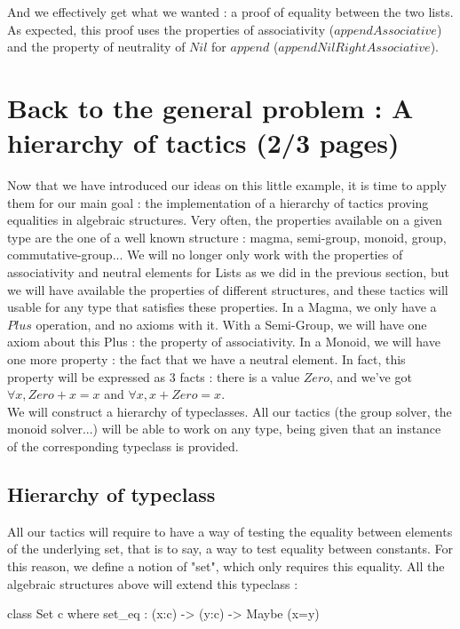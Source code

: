 \documentclass{sigplanconf}
\begin{document}
And we effectively get what we wanted : a proof of equality between the two lists. As expected, this proof uses the properties of associativity ($appendAssociative$) and the property of neutrality of $Nil$ for $append$ ($appendNilRightAssociative$).

\section {Back to the general problem : A hierarchy of tactics (2/3 pages)}

Now that we have introduced our ideas on this little example, it is time to apply them for our main goal : the implementation of a hierarchy of tactics proving equalities in algebraic structures. Very often, the properties available on a given type are the one of a well known structure : magma, semi-group, monoid, group, commutative-group...  We will no longer only work with the properties of associativity and neutral elements for Lists as we did in the previous section, but we will have available the properties of different structures, and these tactics will usable for any type that satisfies these properties.
In a Magma, we only have a $Plus$ operation, and no axioms with it. With a Semi-Group, we will have one axiom about this Plus : the property of associativity. In a Monoid, we will have one more property : the fact that we have a neutral element. In fact, this property will be expressed as 3 facts : there is a value $Zero$, and we've got $\forall x, Zero + x = x$ and $\forall x, x + Zero = x$. \\

We will construct a hierarchy of typeclasses. All our tactics (the group solver, the monoid solver...) will be able to work on any type, being given that an instance of the corresponding typeclass is provided.

\subsection {Hierarchy of typeclass}

All our tactics will require to have a way of testing the equality between elements of the underlying set, that is to say, a way to test equality between constants. For this reason, we define a notion of "set", which only requires this equality. All the algebraic structures above will extend this typeclass :

\begin{code}[caption=Set, captionpos=b, label=lst1:haskell2]
class Set c where
    set_eq : (x:c) -> (y:c) -> Maybe (x=y)
\end{code}
\end{document}
